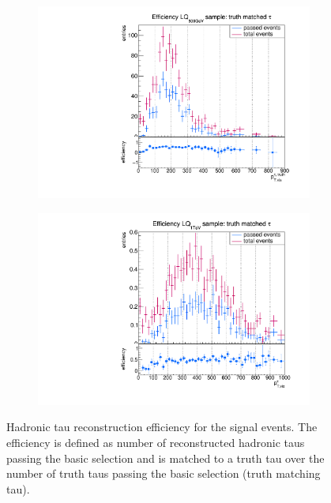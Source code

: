 %
\begin{figure}
  \centering
                \begin{subfigure}[t]{0.49\textwidth}
                \includegraphics[width=\textwidth]{figures/plots/LQ75/Divided_Tau.pdf}
                \label{DividedTau:signal:LQ75}
                \end{subfigure}
                \begin{subfigure}[t]{0.49\textwidth}
                \includegraphics[width=\textwidth]{figures/plots/LQ76/Divided_Tau.pdf}
                \label{DividedTau:signal:LQ76}
                \end{subfigure}
\caption[Hadronic tau reconstruction efficiency for the signal events.]{Hadronic tau reconstruction efficiency for the signal events. The efficiency is defined as number of reconstructed hadronic taus passing the basic selection and is matched to a truth tau over the number of truth taus passing the basic selection (truth matching tau).}
\label{DividedTau:signal}
\end{figure}
